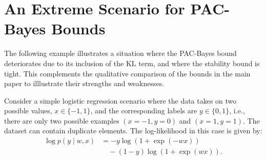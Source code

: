 
\section{An Extreme Scenario for PAC-Bayes Bounds}
\label{app:pacbayes}

The following example illustrates a situation where the PAC-Bayes bound deteriorates due to its inclusion of the KL term,
and where the stability bound is tight. This complements the qualitative comparison of the bounds in the main paper to illlustrate their strengths and weaknesses. 

Consider a simple logistic regression scenario where the data takes on two possible values, \( x \in \{-1, 1\} \), and the corresponding labels are \( y \in \{0, 1\} \), i.e., there are only two possible examples $(x=-1, y=0)$ and $(x=1, y=1)$. 
The dataset can contain duplicate elements. The log-likelihood in this case is given by:
\begin{align}
    \log p(y \mid w, x) &= -y \log (1 + \exp{(-wx)}) \\
    & \quad - (1-y) \log (1 + \exp(wx)).
\end{align}

